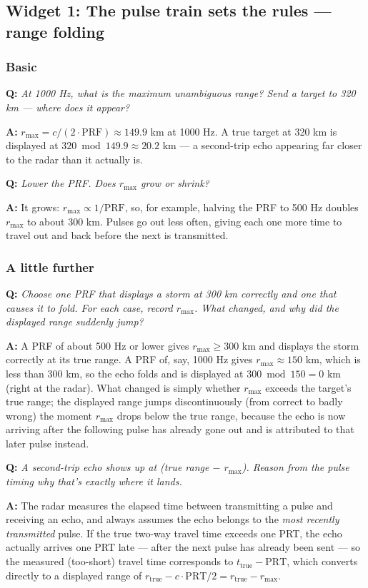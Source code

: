 \documentclass[11pt]{article}
\newenvironment{qa}[1]{\par\noindent\textbf{\color{qgray}Q: }\emph{#1}\par\noindent\textbf{A: }}{\par\vspace{6pt}}
\newcommand{\tier}[1]{\subsubsection*{#1}}
\begin{document}
\subsection{Widget 1: The pulse train sets the rules --- range folding}

\tier{Basic}
\begin{qa}{At 1000 Hz, what is the maximum unambiguous range? Send a target to 320 km --- where does it appear?}
$r_{\max}=c/(2\cdot\mathrm{PRF})\approx149.9$ km at 1000 Hz. A true target at 320 km is displayed at $320\bmod149.9\approx20.2$ km --- a second-trip echo appearing far closer to the radar than it actually is.
\end{qa}
\begin{qa}{Lower the PRF. Does $r_{\max}$ grow or shrink?}
It grows: $r_{\max}\propto1/\mathrm{PRF}$, so, for example, halving the PRF to 500 Hz doubles $r_{\max}$ to about 300 km. Pulses go out less often, giving each one more time to travel out and back before the next is transmitted.
\end{qa}

\tier{A little further}
\begin{qa}{Choose one PRF that displays a storm at 300 km correctly and one that causes it to fold. For each case, record $r_{\max}$. What changed, and why did the displayed range suddenly jump?}
A PRF of about 500 Hz or lower gives $r_{\max}\ge300$ km and displays the storm correctly at its true range. A PRF of, say, 1000 Hz gives $r_{\max}\approx150$ km, which is less than 300 km, so the echo folds and is displayed at $300\bmod150=0$ km (right at the radar). What changed is simply whether $r_{\max}$ exceeds the target's true range; the displayed range jumps discontinuously (from correct to badly wrong) the moment $r_{\max}$ drops below the true range, because the echo is now arriving after the following pulse has already gone out and is attributed to that later pulse instead.
\end{qa}
\begin{qa}{A second-trip echo shows up at (true range $-$ $r_{\max}$). Reason from the pulse timing why that's exactly where it lands.}
The radar measures the elapsed time between transmitting a pulse and receiving an echo, and always assumes the echo belongs to the \emph{most recently transmitted} pulse. If the true two-way travel time exceeds one PRT, the echo actually arrives one PRT late --- after the next pulse has already been sent --- so the measured (too-short) travel time corresponds to $t_{\mathrm{true}}-\mathrm{PRT}$, which converts directly to a displayed range of $r_{\mathrm{true}} - c\cdot\mathrm{PRT}/2 = r_{\mathrm{true}} - r_{\max}$.
\end{qa}
\end{document}
